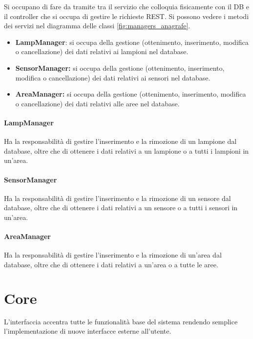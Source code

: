 Si occupano di fare da tramite tra il servizio che colloquia fisicamente con il DB e il controller che si occupa di gestire le richieste REST.
Si possono vedere i metodi dei servizi nel diagramma delle classi \ref{fig:managers_anagrafe}.

\begin{itemize}
    \item \textbf{LampManager}: si occupa della gestione (ottenimento, inserimento, modifica o cancellazione) dei dati relativi ai lampioni nel database.
    \item \textbf{SensorManager:} si occupa della gestione (ottenimento, inserimento, modifica o cancellazione) dei dati relativi ai sensori nel database. 
    \item \textbf{AreaManager:} si occupa della gestione (ottenimento, inserimento, modifica o cancellazione) dei dati relativi alle aree nel database.
\end{itemize}

\paragraph{LampManager}

Ha la responsabilità di gestire l'inserimento e la rimozione di un lampione dal database, oltre che di ottenere i dati relativi a un lampione o a tutti i lampioni in un'area.

\paragraph{SensorManager}

Ha la responsabilità di gestire l'inserimento e la rimozione di un sensore dal database, oltre che di ottenere i dati relativi a un sensore o a tutti i sensori in un'area.

\paragraph{AreaManager}
Ha la responsabilità di gestire l'inserimento e la rimozione di un'area dal database, oltre che di ottenere i dati relativi a un'area o a tutte le aree.

\section{Core}\label{sec:core} L'interfaccia accentra tutte le funzionalità base del sistema rendendo semplice l'implementazione di nuove interfacce esterne all'utente.

